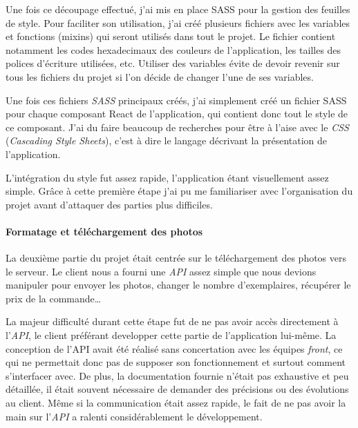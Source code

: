 \documentclass[12pt,a4paper]{article}
\begin{document}
  \bigskip

  Une fois ce découpage effectué, j'ai mis en place SASS pour la gestion
  des feuilles de style. Pour faciliter son utilisation, j'ai créé
  plusieurs fichiers avec les variables et fonctions (mixins) qui seront
  utilisés dans tout le projet. Le fichier contient notamment les codes
  hexadecimaux des couleurs de l'application, les tailles des polices
  d'écriture utilisées, etc. Utiliser des variables évite de devoir
  revenir sur tous les fichiers du projet si l'on décide de changer l'une
  de ses variables.

  \bigskip

  Une fois ces fichiers \emph{SASS} principaux créés, j'ai simplement créé
  un fichier SASS pour chaque composant React de l'application, qui
  contient donc tout le style de ce composant. J'ai du faire beaucoup de
  recherches pour être à l'aise avec le \emph{CSS} (\emph{Cascading Style
  Sheets}), c'est à dire le langage décrivant la présentation de
  l'application.

  \bigskip

  L'intégration du style fut assez rapide, l'application étant
  visuellement assez simple. Grâce à cette première étape j'ai pu me
  familiariser avec l'organisation du projet avant d'attaquer des parties
  plus difficiles.

  \bigskip

  \paragraph{Formatage et téléchargement des
  photos}\label{formatage-et-tuxe9luxe9chargement-des-photos}

  \bigskip

  La deuxième partie du projet était centrée sur le téléchargement des
  photos vers le serveur. Le client nous a fourni une \emph{API} assez
  simple que nous devions manipuler pour envoyer les photos, changer le
  nombre d'exemplaires, récupérer le prix de la commande\ldots{}

  \bigskip

  La majeur difficulté durant cette étape fut de ne pas avoir accès
  directement à l'\emph{API}, le client préférant developper cette partie
  de l'application lui-même. La conception de l'API avait été réalisé sans
  concertation avec les équipes \emph{front}, ce qui ne permettait donc
  pas de supposer son fonctionnement et surtout comment s'interfacer avec.
  De plus, la documentation fournie n'était pas exhaustive et peu
  détaillée, il était souvent nécessaire de demander des précisions ou des
  évolutions au client. Même si la communication était assez rapide, le
  fait de ne pas avoir la main sur l'\emph{API} a ralenti considérablement
  le développement.
\end{document}
